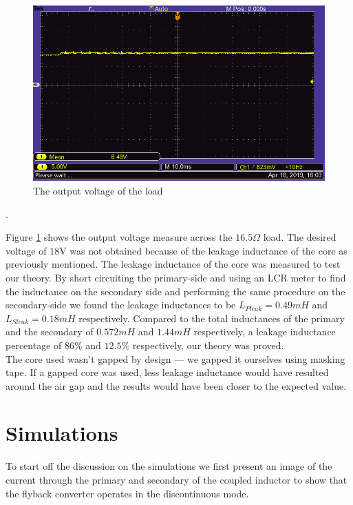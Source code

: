 \documentclass[a4paper, 12pt]{article}
\begin{document}
\begin{figure}[H]
  \centering
  \includegraphics[width=\textwidth]{images/output_from_load.png}
  \caption{The output voltage of the load}
  \label{fig:output_from_load}
\end{figure}. 

Figure \ref{fig:output_from_load} shows the output voltage measure across the $16.5\Omega$ load. The desired voltage of $18$V was not obtained because of the leakage inductance of the core as previously mentioned. The leakage inductance of the core was measured to test our theory. By short circuiting the primary-side and using an LCR meter to find the inductance on the secondary side and performing the same procedure on the secondary-side we found the leakage inductances to be $L_{Pleak} = 0.49mH$ and $L_{Sleak} = 0.18mH$ respectively. Compared to the total inductances of the primary and the secondary of $0.572mH$ and $1.44mH$ respectively, a leakage inductance percentage of $86\%$ and $12.5\%$ respectively, our theory was proved.\\

The core used wasn't gapped by design --- we gapped it ourselves using masking tape. If a gapped core was used, less leakage inductance would have resulted around the air gap and the results would have been closer to the expected value.

\section{Simulations} %
  \label{sec:simulations}

  To start off the discussion on the simulations we first present an image of the current through the primary and secondary of the coupled inductor to show that the flyback converter operates in the discontinuous mode.
\end{document}
